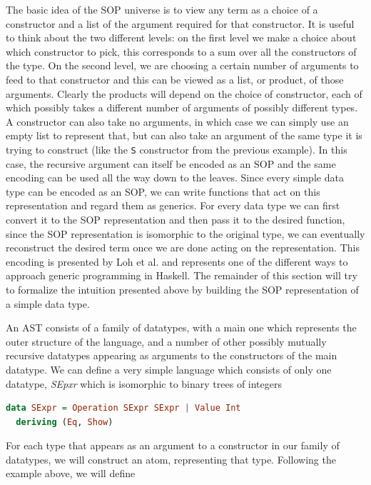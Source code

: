\documentclass[11pt]{article}
\begin{document}
The basic idea of the SOP universe is to view any term as a choice of a constructor and a list of the argument 
required for that constructor. It is useful to think about the two different levels: on the first level we 
make a choice about which constructor to pick, this corresponds to a sum
over all the constructors of the type. On the second level, we are choosing a certain number of arguments 
to feed to that constructor and this can be viewed as a list, or product, of 
those arguments. Clearly the products will depend on the choice of constructor, 
each of which possibly takes a different number of arguments of possibly 
different types. A constructor can also take no arguments, in which case we 
can simply use an empty list to represent that, but can also take an argument of 
the same type it is trying to construct (like the \texttt{S} constructor from the previous example). 
In this case, the recursive argument can itself be encoded as an SOP 
and the same encoding can be used all the way down to the leaves. 
Since every simple data type can be encoded as an SOP, we can write functions 
that act on this representation and regard them as generics. For every data type 
we can first convert it to the SOP representation and then pass it to 
the desired function, since the SOP representation is isomorphic to the original type, we can eventually reconstruct the 
desired term once we are done acting on the representation. This encoding is 
presented by Loh et al. \cite{true-sop} and represents one of the different ways to 
approach generic programming in Haskell. 
The remainder of this section will try to formalize the intuition presented 
above by building the SOP representation of a simple data type. 

\vfill

An AST consists of a family of datatypes, with a main one which
represents the outer structure of the language, and a number of other
possibly mutually recursive datatypes appearing as arguments to the
constructors of the main datatype. We can define a very simple language which 
consists of only one datatype, \emph{SEpxr} which is isomorphic to binary trees 
of integers

\begin{lstlisting}[language=haskell]
data SExpr = Operation SExpr SExpr | Value Int
  deriving (Eq, Show)
\end{lstlisting}

For each type that appears as an argument to a constructor in our family
of datatypes, we will construct an atom, representing that type.
Following the example above, we will define
\end{document}

